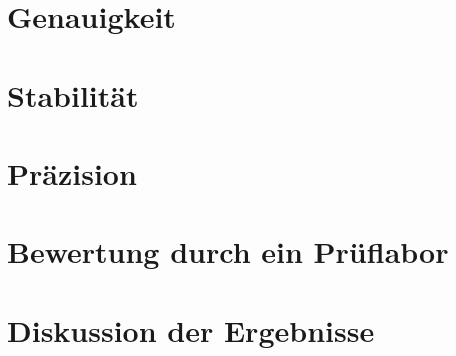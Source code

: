 \section{Genauigkeit}

\section{Stabilität}

\section{Präzision}

\section{Bewertung durch ein Prüflabor}

\section{Diskussion der Ergebnisse}